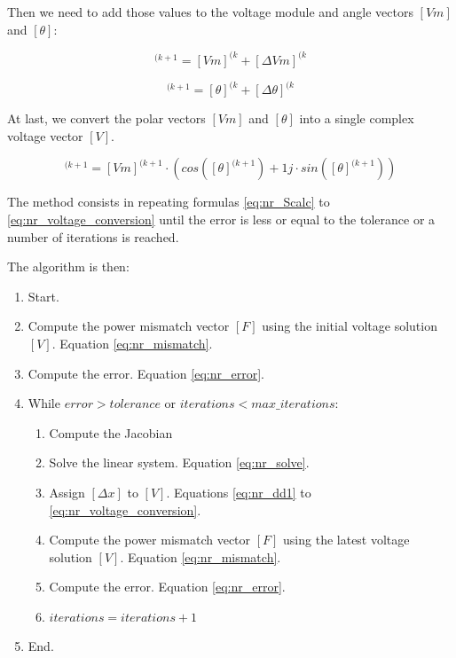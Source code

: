 \documentclass[nols,a4paper,twoside,symmetric,notoc,fleqn]{tufte-book}
\begin{document}
Then we need to add those values to the voltage module and angle vectors $[Vm]$ and $[\theta]$:

\begin{equation}
[Vm]^{(k+1} = [Vm]^{(k} + [\Delta Vm]^{(k}
\end{equation}


\begin{equation}
[\theta]^{(k+1} = [\theta]^{(k} + [\Delta \theta]^{(k}
\end{equation}

At last, we convert the polar vectors  $[Vm]$ and $[\theta]$ into a single complex voltage vector $[V]$.

\begin{equation}
[V]^{(k+1} = [Vm]^{(k+1} \cdot \left( cos([\theta]^{(k+1}) + 1j \cdot sin([\theta]^{(k+1})\right)
\label{eq:nr_voltage_conversion}
\end{equation}

The method consists in repeating formulas \ref{eq:nr_Scalc} to \ref{eq:nr_voltage_conversion} until the error is less or equal to the tolerance or a number of iterations is reached.

The algorithm is then:

\begin{enumerate}

\item Start.

\item Compute the power mismatch vector $[F]$ using the initial voltage solution $[V]$. Equation \ref{eq:nr_mismatch}.

\item Compute the error. Equation \ref{eq:nr_error}.

\item While $error > tolerance$ or $iterations < max\_iterations$:

	\begin{enumerate}
	\item Compute the Jacobian
	
	\item Solve the linear system. Equation \ref{eq:nr_solve}.
	
	\item Assign $[\Delta x]$ to $[V]$. Equations \ref{eq:nr_dd1} to \ref{eq:nr_voltage_conversion}.
	
	\item Compute the power mismatch vector $[F]$ using the latest voltage solution $[V]$. Equation \ref{eq:nr_mismatch}.
	
	\item Compute the error. Equation \ref{eq:nr_error}.
	
	\item $iterations = iterations + 1$
	\end{enumerate}

\item End.
\end{enumerate}
\end{document}
